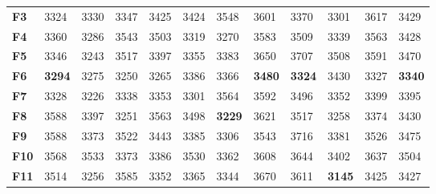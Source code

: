 \documentclass[runningheads]{llncs}
\begin{document}
\begin{table}[bt]
\begin{center}
\begin{tabular}{|l|l|l|l|l|l|l|l|l|l|l|l|}
      \textbf{F3}          & 3324                           & 3330                           & 3347                           & 3425 & 3424                           & 3548                           & 3601                           & 3370 & 3301                           & 3617 & 3429 \\
      \textbf{F4}          & 3360                           & 3286                           & 3543                           & 3503 & 3319                           & 3270                           & 3583                           & 3509 & 3339                           & 3563 & 3428 \\
      \textbf{F5}          & 3346                           & 3243                           & 3517                           & 3397 & 3355                           & 3383                           & 3650                           & 3707 & 3508                           & 3591 & 3470 \\
      \textbf{F6}          & \textbf{3294} & 3275                           & 3250                           & 3265 & 3386                           & 3366                           & \textbf{3480} & \textbf{3324} & 3430                           & 3327 & \textbf{3340} \\
      \textbf{F7}          & 3328                           & 3226                           & 3338                           & 3353 & 3301                           & 3564                           & 3592                           & 3496 & 3352                           & 3399 & 3395 \\
      \textbf{F8}          & 3588                           & 3397                           & 3251                           & 3563 & 3498                           & \textbf{3229} & 3621                           & 3517 & 3258                           & 3374 & 3430 \\
      \textbf{F9}          & 3588                           & 3373                           & 3522                           & 3443 & 3385                           & 3306                           & 3543                           & 3716 & 3381                           & 3526 & 3475 \\
      \textbf{F10}         & 3568                           & 3533                           & 3373                           & 3386 & 3530                           & 3362                           & 3608                           & 3644 & 3402                           & 3637 & 3504 \\
      \textbf{F11}         & 3514                           & 3256                           & 3585                           & 3352 & 3365                           & 3344                           & 3670                           & 3611 & \textbf{3145} & 3425 & 3427 \\

\end{tabular}
\end{center}
\end{table}
\end{document}
